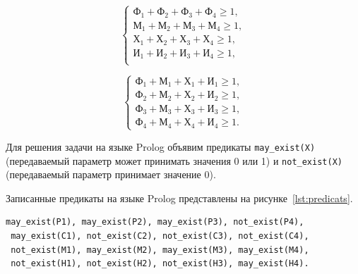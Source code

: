 \begin{minipage}[h!]{0.45\linewidth}
  \begin{equation*}
    \left\{
      \begin{aligned}
        \texttt{Ф}_1 + \texttt{Ф}_2 + \texttt{Ф}_3 + \texttt{Ф}_4 \ge 1, \\
        \texttt{М}_1 + \texttt{М}_2 + \texttt{М}_3 + \texttt{М}_4 \ge 1, \\
        \texttt{Х}_1 + \texttt{Х}_2 + \texttt{Х}_3 + \texttt{Х}_4 \ge 1, \\
        \texttt{И}_1 + \texttt{И}_2 + \texttt{И}_3 + \texttt{И}_4 \ge 1, \\
      \end{aligned}
    \right.
  \end{equation*}
\end{minipage}
\hfill
\begin{minipage}[h!]{0.45\linewidth}
  \begin{equation*}
    \left\{
      \begin{aligned}
        \texttt{Ф}_1 + \texttt{М}_1 + \texttt{Х}_1 + \texttt{И}_1 \ge 1, \\
        \texttt{Ф}_2 + \texttt{М}_2 + \texttt{Х}_2 + \texttt{И}_2 \ge 1, \\
        \texttt{Ф}_3 + \texttt{М}_3 + \texttt{Х}_3 + \texttt{И}_3 \ge 1, \\
        \texttt{Ф}_4 + \texttt{М}_4 + \texttt{Х}_4 + \texttt{И}_4 \ge 1.
      \end{aligned}
    \right.
  \end{equation*}
\end{minipage}

\vspace{7mm}

Для решения задачи на языке Prolog объявим предикаты \texttt{may\_exist(X)}
(передаваемый параметр может принимать значения 0 или 1)
и \texttt{not\_exist(X)} (передаваемый параметр принимает значение 0).

Записанные предикаты на языке Prolog представлены на рисунке~\ref{lst:predicats}.
\begin{lstlisting}[style=source_code,caption=Предикаты программы,label=lst:predicats]
 may_exist(P1), may_exist(P2), may_exist(P3), not_exist(P4),
 may_exist(C1), not_exist(C2), not_exist(C3), not_exist(C4),
 not_exist(M1), may_exist(M2), may_exist(M3), may_exist(M4),
 not_exist(H1), not_exist(H2), not_exist(H3), may_exist(H4).
\end{lstlisting}

